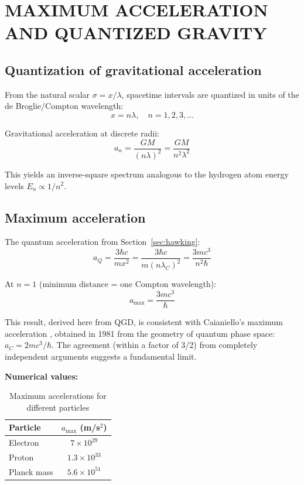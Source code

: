 \documentclass[11pt,a4paper]{article}
\theoremstyle{definition}
\theoremstyle{remark}
\begin{document}
	\section{MAXIMUM ACCELERATION AND QUANTIZED GRAVITY}
	\label{sec:maxaccel}
	
	\subsection{Quantization of gravitational acceleration}
	
	From the natural scalar $\sigma = x/\lambda$, spacetime intervals are quantized in units of the de Broglie/Compton wavelength:
	\begin{equation}
		x = n\lambda, \quad n = 1, 2, 3, \ldots
		\label{eq:quantized_distance}
	\end{equation}
	
	Gravitational acceleration at discrete radii:
	\begin{equation}
		a_n = \frac{GM}{(n\lambda)^2} = \frac{GM}{n^2 \lambda^2}
		\label{eq:quantized_accel}
	\end{equation}
	
	This yields an inverse-square spectrum analogous to the hydrogen atom energy levels $E_n \propto 1/n^2$.
	
	\subsection{Maximum acceleration}
	
	The quantum acceleration from Section~\ref{sec:hawking}:
	\begin{equation}
		a_Q = \frac{3\hbar c}{mx^2} = \frac{3\hbar c}{m(n\lambda_C)^2} = \frac{3mc^3}{n^2\hbar}
		\label{eq:a_Q}
	\end{equation}
	
	At $n = 1$ (minimum distance = one Compton wavelength):
	\begin{equation}
		\boxed{a_{\text{max}} = \frac{3mc^3}{\hbar}}
		\label{eq:a_max}
	\end{equation}
	
	This result, derived here from QGD, is consistent with Caianiello's maximum acceleration \cite{Caianiello1981}, obtained in 1981 from the geometry of quantum phase space: $a_C = 2mc^3/\hbar$. The agreement (within a factor of 3/2) from completely independent arguments suggests a fundamental limit.
	
	\textbf{Numerical values:}
	
	\begin{table}[ht]
		\centering
		\caption{Maximum accelerations for different particles}
		\label{tab:max_accel}
		\begin{tabular}{@{}lc@{}}
			\toprule
			Particle & $a_{\text{max}}$ (m/s$^2$) \\
			\midrule
			Electron & $7 \times 10^{29}$ \\
			Proton & $1.3 \times 10^{33}$ \\
			Planck mass & $5.6 \times 10^{51}$ \\
			\bottomrule
		\end{tabular}
	\end{table}
	
\end{document}
